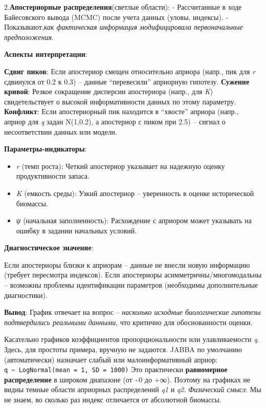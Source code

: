\documentclass[
  letterpaper,
  DIV=11,
  numbers=noendperiod]{scrreprt}
\providecommand{\tightlist}{%
  \setlength{\itemsep}{0pt}\setlength{\parskip}{0pt}}
\begin{document}
2.\textbf{Апостериорные распределения}(светлые области): - Рассчитанные
в ходе Байесовского вывода (MCMC) после учета данных (уловы, индексы). -
Показывают,\emph{как фактическая информация модифицировала
первоначальные предположения}.

\textbf{Аспекты интерпретации}:

\textbf{Сдвиг пиков}: Если апостериор смещен относительно априора
(напр., пик для \emph{r} сдвинулся от 0.2 к 0.3) -- данные
``перевесили'' априорную гипотезу. \textbf{Сужение кривой}: Резкое
сокращение дисперсии апостериора (напр., для \emph{K}) свидетельствует о
высокой информативности данных по этому параметру. \textbf{Конфликт}:
Если апостериорный пик находится в ``хвосте'' априора (напр., априор для
\emph{q} задан N(1,0.2), а апостериор с пиком при 2.5) -- сигнал о
несоответствии данных или модели.

\textbf{Параметры-индикаторы}:

\begin{itemize}
\tightlist
\item
  \emph{r} (темп роста): Четкий апостериор указывает на надежную оценку
  продуктивности запаса.
\item
  \emph{K} (емкость среды): Узкий апостериор -- уверенность в оценке
  исторической биомассы.
\item
  \emph{ψ} (начальная заполненность): Расхождение с априором может
  указывать на ошибку в задании начальных условий.
\end{itemize}

\textbf{Диагностическое значение}:

Если апостериоры близки к априорам -- данные не внесли новую информацию
(требует пересмотра индексов). Если апостериоры
асимметричны/многомодальны -- возможны проблемы идентификации параметров
(необходимы дополнительные диагностики).

\textbf{Вывод}: График отвечает на вопрос -- \emph{насколько исходные
биологические гипотезы подтвердились реальными данными}, что критично
для обоснованности оценки.

Касательно графиков коэффициентов пропорциональности или улавливаемости
\emph{q}. Здесь, для простоты примера, вручную не задаются. JABBA по
умолчанию (автоматически) назначает слабый или малоинформативный априор:
\texttt{q\ \textasciitilde{}\ LogNormal(mean\ =\ 1,\ SD\ =\ 1000)} Это
практически \textbf{равномерное распределение} в широком диапазоне (от
\textasciitilde0 до +∞). Поэтому на графиках не видны темные области
априорных распределений \emph{q1} и \emph{q2}. \emph{Физический смысл}:
Мы не знаем, во сколько раз индекс отличается от абсолютной биомассы.
\end{document}

